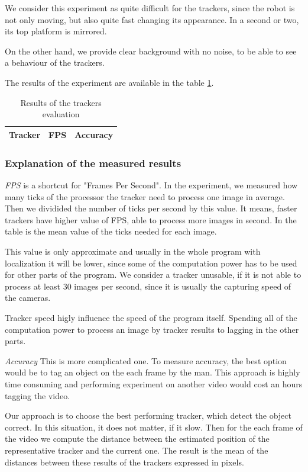 We consider this experiment as quite difficult for the trackers, since the
robot is not only moving, but also quite fast changing its appearance. In a
second or two, its top platform is mirrored.

On the other hand, we provide clear background with no noise, to be able to see
a behaviour of the trackers.

The results of the experiment are available in the table \ref{table:experiment-robot}.

\begin{table}
\centering
\begin{tabular}{l|l|l}
Tracker	& FPS & Accuracy \\
\hline

\end{tabular}
\label{table:experiment-robot}
\caption{Results of the trackers evaluation}
\end{table}

\subsubsection*{Explanation of the measured results}

\emph{FPS} is a shortcut for "Frames Per Second". In the experiment, we measured
how many ticks of the processor the tracker need to process one image in
average. Then we dividided the number of ticks per second by this value. It
means, faster trackers have higher value of FPS, able to process more images in
second. In the table is the mean value of the ticks needed for each image.

This value is only approximate and usually in the whole program with
localization it will be lower, since some of the computation power has to be
used for other parts of the program. We consider a tracker unusable, if it is
not able to process at least 30 images per second, since it is usually the
capturing speed of the cameras.

Tracker speed higly influence the speed of the program itself. Spending all of
the computation power to process an image by tracker results to lagging in the
other parts.

\emph{Accuracy} 
This is more complicated one. To measure accuracy, the best
option would be to tag an object on the each frame by the man. This approach is
highly time consuming and performing experiment on another video would cost an
hours tagging the video.

Our approach is to choose the best performing tracker, which detect the object
correct. In this situation, it does not matter, if it slow. Then for the each
frame of the video we compute the distance between the estimated position of
the representative tracker and the current one. The result is the mean of the
distances between these results of the trackers expressed in pixels.

